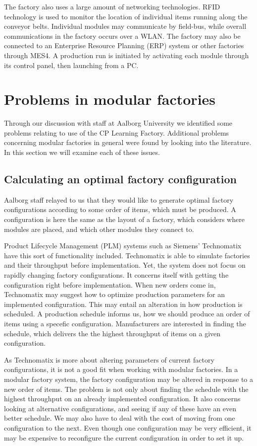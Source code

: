 The factory also uses a large amount of networking technologies. RFID technology is used to monitor the location of individual items running along the conveyor belts. Individual modules may communicate by field-bus, while overall communications in the factory occurs over a WLAN. The factory may also be connected to an Enterprise Resource Planning (ERP) system or other factories through MES4. A production run is initiated by activating each module through its control panel, then launching from a PC.

\section{Problems in modular factories}
Through our discussion with staff at Aalborg University we identified some problems relating to use of the CP Learning Factory. Additional problems concerning modular factories in general were found by looking into the literature. In this section we will examine each of these issues. 

\subsection{Calculating an optimal factory configuration}
Aalborg staff relayed to us that they would like to generate optimal factory configurations according to some order of items, which must be produced. A configuration is here the same as the layout of a factory, which considers where modules are placed, and which other modules they connect to.

Product Lifecycle Management (PLM) systems such as Siemens' Technomatix \cite{Siemens2014} have this sort of functionality included. Technomatix is able to simulate factories and their throughput before implementation. Yet, the system does not focus on rapidly changing factory configurations. It concerns itself with getting the configuration right before implementation. When new orders come in, Technomatix may suggest how to optimize production parameters for an implemented configuration. This may entail an alteration in how production is scheduled. A production schedule informs us, how we should produce an order of items using a specefic configuration. Manufacturers are interested in finding the schedule, which delivers the the highest throughput of items on a given configuration. 

As Technomatix is more about altering parameters of current factory configurations, it is not a good fit when working with modular factories. In a modular factory system, the factory configuration may be altered in response to a new order of items. The problem is not only about finding the schedule with the highest throughput on an already implemented configuration. It also concerns looking at alternative configurations, and seeing if any of these have an even better schedule. We may also have to deal with the cost of moving from one configuration to the next. Even though one configuration may be very efficient, it may be expensive to reconfigure the current configuration in order to set it up. 

